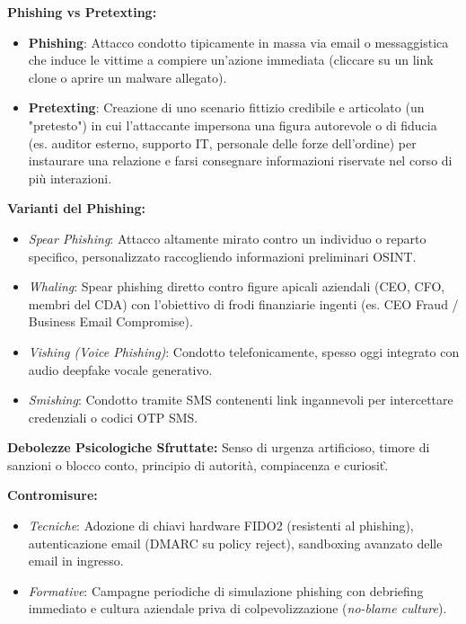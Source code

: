 \documentclass[11pt,a4paper]{article}
\begin{document}
\begin{solutionbox}
\textbf{Phishing vs Pretexting:}
\begin{itemize}
    \item \textbf{Phishing}: Attacco condotto tipicamente in massa via email o messaggistica che induce le vittime a compiere un'azione immediata (cliccare su un link clone o aprire un malware allegato).
    \item \textbf{Pretexting}: Creazione di uno scenario fittizio credibile e articolato (un "pretesto") in cui l'attaccante impersona una figura autorevole o di fiducia (es. auditor esterno, supporto IT, personale delle forze dell'ordine) per instaurare una relazione e farsi consegnare informazioni riservate nel corso di pi\`u interazioni.
\end{itemize}

\textbf{Varianti del Phishing:}
\begin{itemize}
    \item \textit{Spear Phishing}: Attacco altamente mirato contro un individuo o reparto specifico, personalizzato raccogliendo informazioni preliminari OSINT.
    \item \textit{Whaling}: Spear phishing diretto contro figure apicali aziendali (CEO, CFO, membri del CDA) con l'obiettivo di frodi finanziarie ingenti (es. CEO Fraud / Business Email Compromise).
    \item \textit{Vishing (Voice Phishing)}: Condotto telefonicamente, spesso oggi integrato con audio deepfake vocale generativo.
    \item \textit{Smishing}: Condotto tramite SMS contenenti link ingannevoli per intercettare credenziali o codici OTP SMS.
\end{itemize}

\textbf{Debolezze Psicologiche Sfruttate:} Senso di urgenza artificioso, timore di sanzioni o blocco conto, principio di autorit\`a, compiacenza e curiosit\`.

\textbf{Contromisure:}
\begin{itemize}
    \item \textit{Tecniche}: Adozione di chiavi hardware FIDO2 (resistenti al phishing), autenticazione email (DMARC su policy reject), sandboxing avanzato delle email in ingresso.
    \item \textit{Formative}: Campagne periodiche di simulazione phishing con debriefing immediato e cultura aziendale priva di colpevolizzazione (\textit{no-blame culture}).
\end{itemize}
\end{solutionbox}
\end{document}
